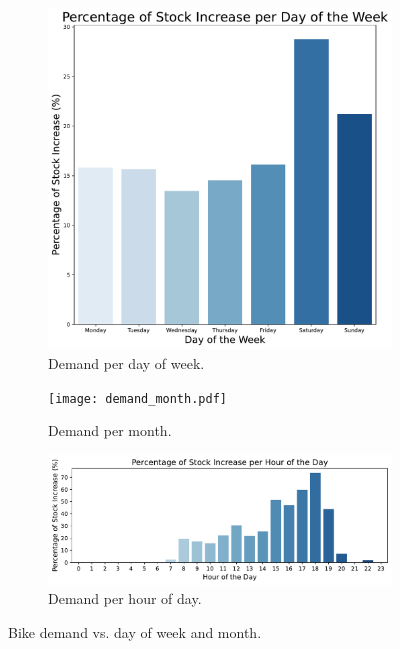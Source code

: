     \begin{figure}[htbp]
        \centering
        \begin{subfigure}{0.45\textwidth}
            \centering
            \includegraphics[width=\textwidth]{demand_day.pdf}
            \caption{Demand per day of week.}
            \label{fig:demand day}
        \end{subfigure}
        \hfill
        \begin{subfigure}{0.45\textwidth}
            \centering
            \texttt{[image: demand\_month.pdf]}
            \caption{Demand per month.}
            \label{fig:demand month}
        \end{subfigure}
        \hfill
        \begin{subfigure}{0.8\textwidth}
            \centering
            \includegraphics[width=\textwidth]{demand_hour.pdf}
            \caption{Demand per hour of day.}
            \label{fig:demand hour}
        \end{subfigure}
        \caption{Bike demand vs. day of week and month.}
        \label{fig:demand day month}
    \end{figure}
    
